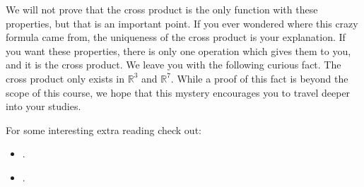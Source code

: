 \documentclass{ximera}
\begin{document}
We will not prove that the cross product is the only function with
these properties, but that is an important point.  If you ever
wondered where this crazy formula came from, the uniqueness of the cross product is your explanation.  If you
want these properties, there is only one operation which gives them to you, and
it is the cross product. We leave you with the following curious fact.
The cross product only exists in $\mathbb{R}^3$ and $\mathbb{R}^7$. While a proof of this fact is
beyond the scope of this course, we hope that this mystery encourages
you to travel deeper into your studies.


For some interesting extra reading check out:
\begin{itemize}
\item {}.
\item {}.
\end{itemize}
\end{document}
